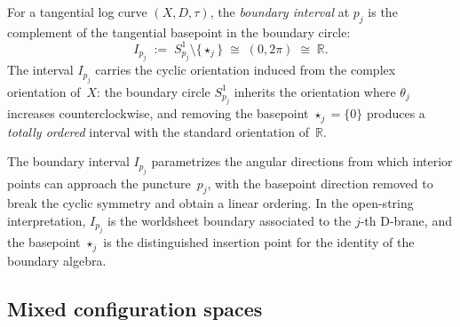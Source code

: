 \begin{definition}
\label{def:boundary-intervals}
For a tangential log curve $(X, D, \tau)$, the
\emph{boundary interval} at $p_j$ is the complement of the
tangential basepoint in the boundary circle:
\begin{equation}\label{eq:boundary-interval}
I_{p_j}
\;:=\;
S^1_{p_j} \setminus \{\star_j\}
\;\cong\;
(0, 2\pi)
\;\cong\;
\mathbb{R}.
\end{equation}
The interval $I_{p_j}$ carries the cyclic orientation induced from
the complex orientation of~$X$: the boundary circle $S^1_{p_j}$
inherits the orientation where $\theta_j$ increases
counterclockwise, and removing the basepoint
$\star_j = \{0\}$ produces a \emph{totally ordered} interval
with the standard orientation of~$\mathbb{R}$.
\end{definition}

\begin{remark}
\label{rem:geometric-interval-meaning}
The boundary interval $I_{p_j}$ parametrizes the angular
directions from which interior points can approach the
puncture~$p_j$, with the basepoint direction removed to break
the cyclic symmetry and obtain a linear ordering. In the
open-string interpretation, $I_{p_j}$ is the worldsheet boundary
associated to the $j$-th D-brane, and the basepoint $\star_j$ is
the distinguished insertion point for the identity of the
boundary algebra.
\end{remark}

\subsection{Mixed configuration spaces}
\label{subsec:mixed-config-spaces}

